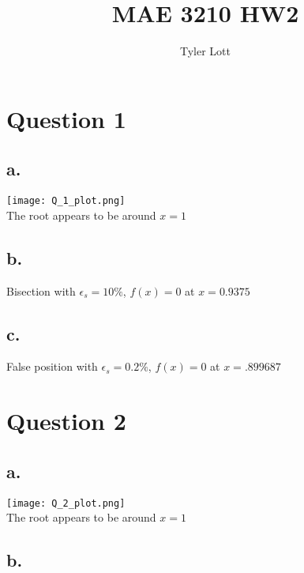 \documentclass[11pt]{article} %
\title{MAE 3210  HW2}
\author{Tyler Lott}
\begin{document}
\maketitle

\section*{Question 1}

\subsection*{a.}

\begin{center}
\texttt{[image: Q\_1\_plot.png]} \\
The root appears to be around $x=1$
\end{center}


\subsection*{b.}

Bisection with $\epsilon_s = 10\%$, $ f(x) = 0$ at {\boldmath$ x = 0.9375 $}

\subsection*{c.}

False position with $\epsilon_s = 0.2\%$, $f(x) = 0$ at {\boldmath$x = .899687$}

\clearpage

\section*{Question 2}

\subsection*{a.}

\begin{center}
	\texttt{[image: Q\_2\_plot.png]} \\
	The root appears to be around $x=1$
\end{center}

\subsection*{b.}
\end{document}
